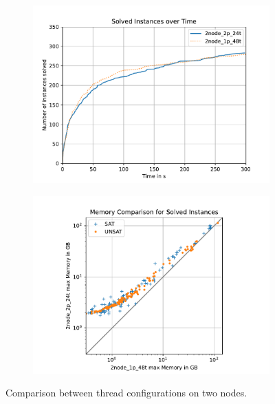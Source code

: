 \documentclass[12pt,a4paper,twoside]{scrartcl}
\numberwithin{equation}{section}
\begin{document}
\begin{figure}
  \center
  \begin{subfigure}[c]{0.45\textwidth}
    \center
    \includegraphics[scale=0.45]{plots/config_compare/2node_config_compare.pdf}
    \caption{}
    \label{2nodeConfigRuntimeCompare}
  \end{subfigure}
  \hfill
  \begin{subfigure}[c]{0.45\textwidth}
    \center
    \includegraphics[scale=0.45]{plots/config_compare/2node_config_mem_compare.pdf}
    \caption{}
    \label{fig:2nodeConfigMemCompare}
  \end{subfigure}
  \caption{Comparison between thread configurations on two nodes.}
  \label{fig:2nodeConfigCompare}
\end{figure}
\end{document}
